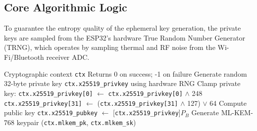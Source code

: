 \documentclass[journal, 10pt]{IEEEtran}
\begin{document}
\subsection{Core Algorithmic Logic}
To guarantee the entropy quality of the ephemeral key generation, the private keys are sampled from the ESP32's hardware True Random Number Generator (TRNG), which operates by sampling thermal and RF noise from the Wi-Fi/Bluetooth receiver ADC.

\begin{algorithm}[!t]
\caption{Client Keypair Generation (\texttt{hybrid\_keygen})}
\begin{algorithmic}[1]
\REQUIRE Cryptographic context \texttt{ctx}
\ENSURE Returns 0 on success; -1 on failure
    \STATE Generate random 32-byte private key \texttt{ctx.x25519\_privkey} using hardware RNG
    \STATE Clamp private key:
    \STATE \texttt{ctx.x25519\_privkey[0]} $\leftarrow$ \texttt{ctx.x25519\_privkey[0]} $\wedge$ 248
    \STATE \texttt{ctx.x25519\_privkey[31]} $\leftarrow$ (\texttt{ctx.x25519\_privkey[31]} $\wedge$ 127) $\vee$ 64
    \STATE Compute public key \texttt{ctx.x25519\_pubkey} $\leftarrow$ [\texttt{ctx.x25519\_privkey}]$P_B$
\ENDIF
{}
    \STATE Generate ML-KEM-768 keypair (\texttt{ctx.mlkem\_pk}, \texttt{ctx.mlkem\_sk})
\ENDIF
{}
\end{algorithmic}
\end{algorithm}
\end{document}
